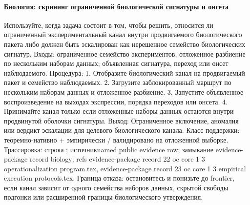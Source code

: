 \paragraph{Биология: скрининг ограниченной биологической сигнатуры и онсета}
Используйте, когда задача состоит в том, чтобы решить, относится ли ограниченный экспериментальный канал внутри продвигаемого биологического пакета либо должен быть эскалирован как нерешенное семейство биологических сигнатур.
Входы: ограниченное семейство экспериментов; \allowbreak отложенное разбиение по нескольким наборам данных; \allowbreak объявленная сигнатура, переход или онсет наблюдаемого.
Процедура: 1. Отобразите биологический канал на продвигаемый пакет и семейство наблюдаемых. 2. Загрузите заблокированный маршрут по нескольким наборам данных и отложенное разбиение. 3. Запустите объявленное воспроизведение на выходах экспрессии, порядка переходов или онсета. 4. Принимайте канал только если отложенные наборы данных остаются внутри продвинутой оболочки сигнатуры.
Выход: Ограниченное включение, аномалия или вердикт эскалации для целевого биологического канала.
Класс поддержки: теоремно-нативно + эмпирически / валидировано на отложенной выборке.
Трассировка: строка ; \allowbreak источникnamed public evidence row; \allowbreak замыкание evidence-package record biology; \allowbreak refs evidence-package record 22 oc core 1 3 operationalization program.tex, \allowbreak evidence-package record 23 oc core 1 3 empirical execution protocols.tex.
Граница отказа: остановитесь и понизьте до frontier, если канал зависит от одного семейства наборов данных, скрытой свободы подгонки или расширенной границы биологического утверждения.

